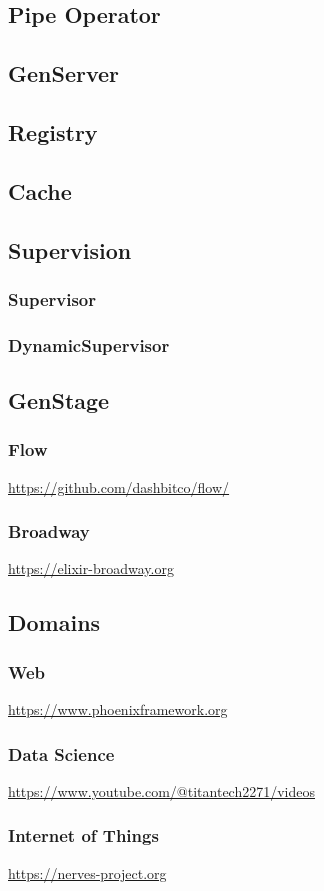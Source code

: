 {\subsection{Pipe Operator}

\subsection{GenServer}

\subsection{Registry}

\subsection{Cache}

\subsection{Supervision}
\subsubsection{Supervisor}
\subsubsection{DynamicSupervisor}

\subsection{GenStage}
\subsubsection{Flow}

\url{https://github.com/dashbitco/flow/}

\subsubsection{Broadway}

\url{https://elixir-broadway.org}

\subsection{Domains}

\subsubsection{Web}

\url{https://www.phoenixframework.org}



\subsubsection{Data Science}

\url{https://www.youtube.com/@titantech2271/videos}

\subsubsection{Internet of Things}

\url{https://nerves-project.org}

}
